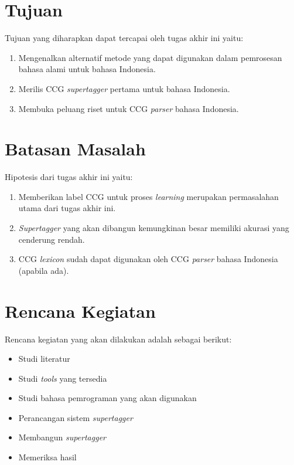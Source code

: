 \section{Tujuan}
Tujuan yang diharapkan dapat tercapai oleh tugas akhir ini yaitu:
\begin{enumerate}
    \item Mengenalkan alternatif metode yang dapat digunakan dalam pemrosesan bahasa alami untuk
      bahasa Indonesia.
    \item Merilis CCG \textit{supertagger} pertama untuk bahasa Indonesia.
    \item Membuka peluang riset untuk CCG \textit{parser} bahasa Indonesia.
\end{enumerate}
\section{Batasan Masalah}
Hipotesis dari tugas akhir ini yaitu:
\begin{enumerate}
    \item Memberikan label CCG untuk proses \textit{learning} merupakan permasalahan utama dari tugas
      akhir ini.
    \item \textit{Supertagger} yang akan dibangun kemungkinan besar memiliki akurasi yang cenderung
      rendah.
    \item CCG \textit{lexicon} sudah dapat digunakan oleh CCG \textit{parser} bahasa Indonesia
      (apabila ada).
\end{enumerate}

\section{Rencana Kegiatan}
Rencana kegiatan yang akan dilakukan adalah sebagai berikut:
\begin{itemize}
    \item Studi literatur
    \item Studi \textit{tools} yang tersedia
    \item Studi bahasa pemrograman yang akan digunakan
    \item Perancangan sistem \textit{supertagger}
    \item Membangun \textit{supertagger}
    \item Memeriksa hasil
\end{itemize}

